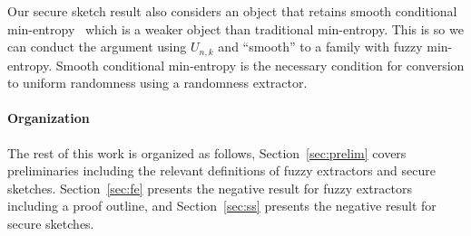 Our secure sketch result also considers an object that retains smooth conditional min-entropy~\cite{renner2005simple} which is a weaker object than traditional min-entropy.  This is so we can conduct the argument using $U_{n,k}$ and ``smooth'' to a family with fuzzy min-entropy. Smooth conditional min-entropy is the necessary condition for conversion to uniform randomness using a randomness extractor. 



\paragraph{Organization} The rest of this work is organized as follows, Section~\ref{sec:prelim} covers preliminaries including the relevant definitions of fuzzy extractors and secure sketches.  Section~\ref{sec:fe} presents the negative result for fuzzy extractors including a proof outline, and Section~\ref{sec:ss} presents the negative result for secure sketches.